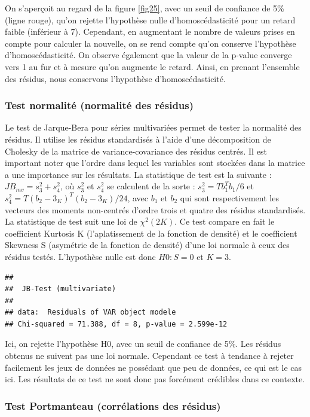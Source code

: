\documentclass[11pt,]{article}
\begin{document}
On s'aperçoit au regard de la figure \ref{fig25}, avec un seuil de
confiance de 5\% (ligne rouge), qu'on rejette l'hypothèse nulle
d'homoscédasticité pour un retard faible (inférieur à 7). Cependant, en
augmentant le nombre de valeurs prises en compte pour calculer la
nouvelle, on se rend compte qu'on conserve l'hypothèse
d'homoscédasticité. On observe également que la valeur de la p-value
converge vers 1 au fur et à mesure qu'on augmente le retard. Ainsi, en
prenant l'ensemble des résidus, nous conservons l'hypothèse
d'homoscédasticité.

\subsubsection{Test normalité (normalité des
résidus)}\label{test-normalite-normalite-des-residus}

Le test de Jarque-Bera pour séries multivariées permet de tester la
normalité des résidus. Il utilise les résidus standardisés à l'aide
d'une décomposition de Cholesky de la matrice de variance-covariance des
résidus centrés. Il est important noter que l'ordre dans lequel les
variables sont stockées dans la matrice a une importance sur les
résultats. La statistique de test est la suivante :
\(JB_{mv} = s_3^2 + s_4^2\), où \(s_3^2\) et \(s_4^2\) se calculent de
la sorte : \(s_3^2 = Tb_1^Tb_1/6\) et
\(s_4^2 = T(b_2 - 3_K)^T(b_2-3_K)/24\), avec \(b_1\) et \(b_2\) qui sont
respectivement les vecteurs des moments non-centrés d'ordre trois et
quatre des résidus standardisés. La statistique de test suit une loi de
\(\chi^2(2K)\). Ce test compare en fait le coefficient Kurtosis K
(l'aplatissement de la fonction de densité) et le coefficient Skewness S
(asymétrie de la fonction de densité) d'une loi normale à ceux des
résidus testés. L'hypothèse nulle est donc \(H0 : S = 0\) et \(K = 3\).

\begin{verbatim}
## 
##  JB-Test (multivariate)
## 
## data:  Residuals of VAR object modele
## Chi-squared = 71.388, df = 8, p-value = 2.599e-12
\end{verbatim}

Ici, on rejette l'hypothèse H0, avec un seuil de confiance de 5\%. Les
résidus obtenus ne suivent pas une loi normale. Cependant ce test à
tendance à rejeter facilement les jeux de données ne possédant que peu
de données, ce qui est le cas ici. Les résultats de ce test ne sont donc
pas forcément crédibles dans ce contexte.

\subsubsection{Test Portmanteau (corrélations des
résidus)}\label{test-portmanteau-correlations-des-residus}
\end{document}
